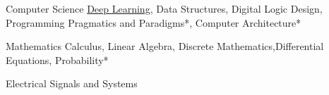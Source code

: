 

\begin{cvskills}

  \cvskill
    {Computer Science} %
    {{\href{https://www.coursera.org/specializations/deep-learning}{Deep Learning}}, Data Structures, Digital Logic Design, Programming Pragmatics and Paradigms*, Computer Architecture*} %


  \cvskill
    {Mathematics} %
    {Calculus, Linear Algebra, Discrete Mathematics,Differential Equations, Probability*} %

\cvskill
{Electrical} %
{Signals and Systems} %


\end{cvskills}
